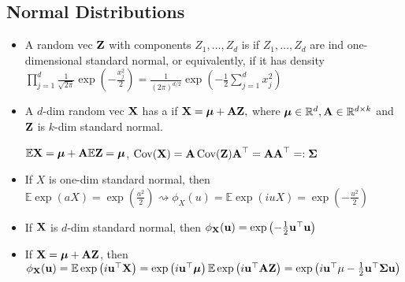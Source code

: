 \subsection*{Normal Distributions}
\begin{itemize}[leftmargin=*]
    \item A random vec $\boldsymbol{\mathbf{Z}}$ with components $Z_{1}, \ldots, Z_{d}$ is  if $Z_{1}, \ldots, Z_{d}$ are ind one-dimensional standard normal, or equivalently, if it has density
$
\prod_{j=1}^{d} \frac{1}{\sqrt{2 \pi}} \exp \left(-\frac{x_{j}^{2}}{2}\right)=\frac{1}{(2 \pi)^{d / 2}} \exp \left(-\frac{1}{2} \sum_{j=1}^{d} x_{j}^{2}\right)
$
    \item A $d$-dim random vec $\boldsymbol{\mathbf{X}}$ has a  if
$
\boldsymbol{\mathbf{X}} = \boldsymbol{\mathbf{\mu}}+\boldsymbol{\mathbf{A Z}},
$
where $\boldsymbol{\mathbf{\mu}} \in \mathbb{R}^{d}, \boldsymbol{\mathbf{A}} \in \mathbb{R}^{d \times k}$ and $\boldsymbol{\mathbf{Z}}$ is $k$-dim standard normal.

$\mathbb{E} \boldsymbol{\mathbf{X}}=\boldsymbol{\mathbf{\mu}}+\boldsymbol{\mathbf{A}} \mathbb{E} \boldsymbol{\mathbf{Z}}=\boldsymbol{\mathbf{\mu}}$, $\operatorname{Cov}(\boldsymbol{\mathbf{X}})=\boldsymbol{\mathbf{A}} \operatorname{Cov}(\boldsymbol{\mathbf{Z}}) \boldsymbol{\mathbf{A}}^{\top}=\boldsymbol{\mathbf{AA}}^{\top}=: \boldsymbol{\mathbf{\Sigma}}$

    \item If $X$ is one-dim standard normal, then $\mathbb{E} \exp (a X)=\exp \left(\frac{a^{2}}{2}\right) \rightsquigarrow \phi_{X}(u)=\mathbb{E} \exp (i u X)=\exp \left(-\frac{u^{2}}{2}\right)$
    
    \item If $\boldsymbol{\mathbf{X}}$ is $d$-dim standard normal, then
$
\phi_{\boldsymbol{\mathbf{X}}}(\boldsymbol{\mathbf{u}})=\exp \left(-\frac{1}{2} \boldsymbol{\mathbf{u}}^{\top} \boldsymbol{\mathbf{u}}\right)
$
    \item If $\boldsymbol{\mathbf{X}} = \boldsymbol{\mathbf{\mu}}+\boldsymbol{\mathbf{AZ}}$, then
$
\phi_{\boldsymbol{\mathbf{X}}}(\boldsymbol{\mathbf{u}}) =\mathbb{E} \exp \left(i \boldsymbol{\mathbf{u}}^{\top} \boldsymbol{\mathbf{X}}\right)=\exp \left(i \boldsymbol{\mathbf{u}}^{\top} \boldsymbol{\mathbf{\mu}}\right) \mathbb{E} \exp \left(i \boldsymbol{\mathbf{u}}^{\top} \boldsymbol{\mathbf{AZ}}\right) =\exp \left(i \boldsymbol{\mathbf{u}}^{\top} \mu-\frac{1}{2} \boldsymbol{\mathbf{u}}^{\top} \boldsymbol{\mathbf{\Sigma}} \boldsymbol{\mathbf{u}}\right)
$
\end{itemize}

